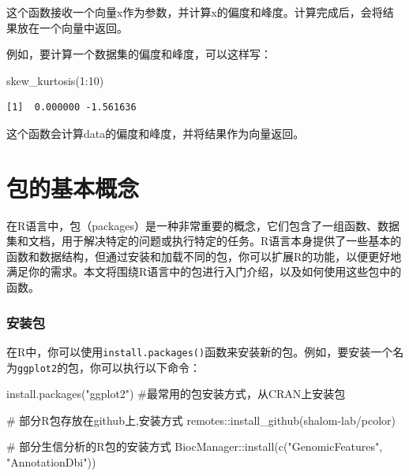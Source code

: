 \documentclass[
  letterpaper,
  DIV=11,
  numbers=noendperiod]{scrreprt}
\newenvironment{Shaded}{\begin{snugshade}}{\end{snugshade}}
\newcommand{\CommentTok}[1]{\textcolor[rgb]{0.37,0.37,0.37}{#1}}
\newcommand{\DecValTok}[1]{\textcolor[rgb]{0.68,0.00,0.00}{#1}}
\newcommand{\FunctionTok}[1]{\textcolor[rgb]{0.28,0.35,0.67}{#1}}
\newcommand{\NormalTok}[1]{\textcolor[rgb]{0.00,0.23,0.31}{#1}}
\newcommand{\SpecialCharTok}[1]{\textcolor[rgb]{0.37,0.37,0.37}{#1}}
\newcommand{\StringTok}[1]{\textcolor[rgb]{0.13,0.47,0.30}{#1}}
\begin{document}
这个函数接收一个向量x作为参数，并计算x的偏度和峰度。计算完成后，会将结果放在一个向量中返回。

例如，要计算一个数据集的偏度和峰度，可以这样写：

\begin{Shaded}
\begin{Highlighting}[]
  \FunctionTok{skew\_kurtosis}\NormalTok{(}\DecValTok{1}\SpecialCharTok{:}\DecValTok{10}\NormalTok{)}
\end{Highlighting}
\end{Shaded}

\begin{verbatim}
[1]  0.000000 -1.561636
\end{verbatim}

这个函数会计算data的偏度和峰度，并将结果作为向量返回。

\hypertarget{ux5305ux7684ux57faux672cux6982ux5ff5}{%
\chapter{包的基本概念}\label{ux5305ux7684ux57faux672cux6982ux5ff5}}

在R语言中，包（packages）是一种非常重要的概念，它们包含了一组函数、数据集和文档，用于解决特定的问题或执行特定的任务。R语言本身提供了一些基本的函数和数据结构，但通过安装和加载不同的包，你可以扩展R的功能，以便更好地满足你的需求。本文将围绕R语言中的包进行入门介绍，以及如何使用这些包中的函数。

\hypertarget{ux5b89ux88c5ux5305}{%
\subsection{安装包}\label{ux5b89ux88c5ux5305}}

在R中，你可以使用\texttt{install.packages()}函数来安装新的包。例如，要安装一个名为\texttt{ggplot2}的包，你可以执行以下命令：

\begin{Shaded}
\begin{Highlighting}[]
\FunctionTok{install.packages}\NormalTok{(}\StringTok{"ggplot2"}\NormalTok{) }\CommentTok{\#最常用的包安装方式，从CRAN上安装包}

\CommentTok{\# 部分R包存放在github上,安装方式}
\NormalTok{remotes}\SpecialCharTok{::}\FunctionTok{install\_github}\NormalTok{(}\StringTok{\textquotesingle{}shalom{-}lab/pcolor\textquotesingle{}}\NormalTok{)}

\CommentTok{\# 部分生信分析的R包的安装方式}
\NormalTok{BiocManager}\SpecialCharTok{::}\FunctionTok{install}\NormalTok{(}\FunctionTok{c}\NormalTok{(}\StringTok{"GenomicFeatures"}\NormalTok{, }\StringTok{"AnnotationDbi"}\NormalTok{))}
\end{Highlighting}
\end{Shaded}
\end{document}
